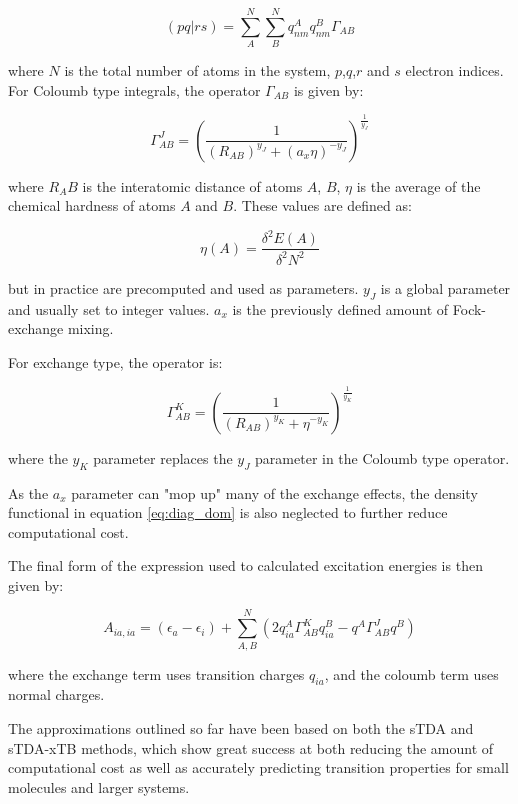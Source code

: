 \begin{equation}
\left(pq|rs\right) = \sum^N_A \sum^N_B q^A_{nm} q^B_{nm} \Gamma_{AB}
\end{equation}

where $N$ is the total number of atoms in the system, $p$,$q$,$r$ and $s$ electron
indices. For Coloumb type integrals, the operator $\Gamma_{AB}$ is given by:

\begin{equation}
\Gamma^J_{AB} = \left(\frac{1}{\left(R_{AB}\right)^{y_J} + \left(a_x \eta\right)^{-y_J}} \right)^{\frac{1}{y_J}}
\end{equation}

where $R_AB$ is the interatomic distance of atoms $A$, $B$, $\eta$ is the average
of the chemical hardness of atoms $A$ and $B$. These values are defined as:

\begin{equation}
\eta\left(A\right) = \frac{\delta^2 E\left(A\right)}{\delta^2 N^2}
\end{equation}

but in practice are precomputed and used as parameters. $y_J$ is a global parameter
and usually set to integer values. $a_x$ is the previously defined amount of Fock-exchange
mixing.

For exchange type, the operator is:

\begin{equation}
\Gamma^K_{AB} = \left(\frac{1}{\left(R_{AB}\right)^{y_K} + \eta^{-y_K}} \right)^{\frac{1}{y_K}}
\end{equation}

where the $y_K$ parameter replaces the $y_J$ parameter in the Coloumb type operator.

As the $a_x$ parameter can "mop up" many of the exchange effects, the density functional
in equation \ref{eq:diag_dom} is also neglected to further reduce computational cost.

The final form of the expression used to calculated excitation energies is then
given by:

\begin{equation}
A_{ia,ia} = \left(\epsilon_a - \epsilon_i\right) + \sum^N_{A,B}\left(2 q_{ia}^A \Gamma^K_{AB} q_{ia}^B - q^A \Gamma^J_{AB} q^B\right)
\end{equation}

where the exchange term uses transition charges $q_{ia}$, and the coloumb term uses
normal charges.

The approximations outlined so far have been based on both the sTDA \cite{Grimme2013}
and sTDA-xTB \cite{Grimme2016} methods, which show great success at both reducing the 
amount of computational cost as well as accurately predicting transition properties
for small molecules and larger systems.

